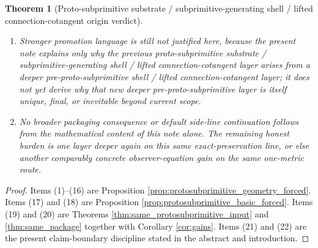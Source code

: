 \documentclass[11pt]{article}
\newtheorem{theorem}{Theorem}
\begin{document}
\begin{theorem}[Proto-subprimitive substrate / subprimitive-generating shell / lifted connection-cotangent origin verdict]
\begin{enumerate}
    \item Stronger promotion language is still not justified here, because the present note explains only why the previous proto-subprimitive substrate / subprimitive-generating shell / lifted connection-cotangent layer arises from a deeper pre-proto-subprimitive shell / lifted connection-cotangent layer; it does not yet derive why that new deeper pre-proto-subprimitive layer is itself unique, final, or inevitable beyond current scope.
    \item No broader packaging consequence or default side-line continuation follows from the mathematical content of this note alone. The remaining honest burden is one layer deeper again on this same exact-preservation line, or else another comparably concrete observer-equation gain on the same one-metric route.
\end{enumerate}
\end{theorem}

\begin{proof}
Items (1)--(16) are Proposition \ref{prop:protosubprimitive_geometry_forced}. Items (17) and (18) are Proposition \ref{prop:protosubprimitive_basic_forced}. Items (19) and (20) are Theorems \ref{thm:same_protosubprimitive_input} and \ref{thm:same_package} together with Corollary \ref{cor:gains}. Items (21) and (22) are the present claim-boundary discipline stated in the abstract and introduction.
\end{proof}
\end{document}
